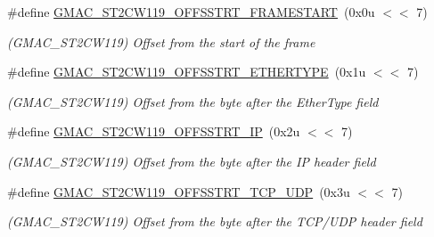 \begin{DoxyCompactItemize}
\item 
\mbox{\label{group__SAME70__GMAC_gab255cd22ec26511db33419713e5a8abe}} 
\#define \mbox{\hyperlink{group__SAME70__GMAC_gab255cd22ec26511db33419713e5a8abe}{G\+M\+A\+C\+\_\+\+S\+T2\+C\+W119\+\_\+\+O\+F\+F\+S\+S\+T\+R\+T\+\_\+\+F\+R\+A\+M\+E\+S\+T\+A\+RT}}~(0x0u $<$$<$ 7)
\begin{DoxyCompactList}\small\item\em (G\+M\+A\+C\+\_\+\+S\+T2\+C\+W119) Offset from the start of the frame \end{DoxyCompactList}\item 
\mbox{\label{group__SAME70__GMAC_ga39d82a1d786ba0328ff736367b518490}} 
\#define \mbox{\hyperlink{group__SAME70__GMAC_ga39d82a1d786ba0328ff736367b518490}{G\+M\+A\+C\+\_\+\+S\+T2\+C\+W119\+\_\+\+O\+F\+F\+S\+S\+T\+R\+T\+\_\+\+E\+T\+H\+E\+R\+T\+Y\+PE}}~(0x1u $<$$<$ 7)
\begin{DoxyCompactList}\small\item\em (G\+M\+A\+C\+\_\+\+S\+T2\+C\+W119) Offset from the byte after the Ether\+Type field \end{DoxyCompactList}\item 
\mbox{\label{group__SAME70__GMAC_gab92aa0c1638bbb0a4071988fd9d92c70}} 
\#define \mbox{\hyperlink{group__SAME70__GMAC_gab92aa0c1638bbb0a4071988fd9d92c70}{G\+M\+A\+C\+\_\+\+S\+T2\+C\+W119\+\_\+\+O\+F\+F\+S\+S\+T\+R\+T\+\_\+\+IP}}~(0x2u $<$$<$ 7)
\begin{DoxyCompactList}\small\item\em (G\+M\+A\+C\+\_\+\+S\+T2\+C\+W119) Offset from the byte after the IP header field \end{DoxyCompactList}\item 
\mbox{\label{group__SAME70__GMAC_ga262f36f35c2ac5e16769ac139575389e}} 
\#define \mbox{\hyperlink{group__SAME70__GMAC_ga262f36f35c2ac5e16769ac139575389e}{G\+M\+A\+C\+\_\+\+S\+T2\+C\+W119\+\_\+\+O\+F\+F\+S\+S\+T\+R\+T\+\_\+\+T\+C\+P\+\_\+\+U\+DP}}~(0x3u $<$$<$ 7)
\begin{DoxyCompactList}\small\item\em (G\+M\+A\+C\+\_\+\+S\+T2\+C\+W119) Offset from the byte after the T\+C\+P/\+U\+DP header field \end{DoxyCompactList}\item 
\mbox{\label{group__SAME70__GMAC_gabc5883ea3ca153d6d7c24f47bbeaa73b}} 

\end{DoxyCompactItemize}
